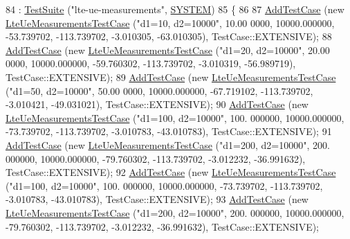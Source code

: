 \begin{DoxyCode}
84   : \hyperlink{classns3_1_1TestSuite_a904b0c40583b744d30908aeb94636d1a}{TestSuite} (\textcolor{stringliteral}{"lte-ue-measurements"}, \hyperlink{classns3_1_1TestSuite_a1ebfcab34ec8161e085e8e3a1855eae0a90c5529a26ab3a5ffcc6e57040dbd82e}{SYSTEM})
85 \{
86 
87   \hyperlink{classns3_1_1TestCase_a3718088e3eefd5d6454569d2e0ddd835}{AddTestCase} (\textcolor{keyword}{new} \hyperlink{classLteUeMeasurementsTestCase}{LteUeMeasurementsTestCase} (\textcolor{stringliteral}{"d1=10, d2=10000"},  10.00
      0000, 10000.000000, -53.739702, -113.739702, -3.010305, -63.010305), TestCase::EXTENSIVE);
88   \hyperlink{classns3_1_1TestCase_a3718088e3eefd5d6454569d2e0ddd835}{AddTestCase} (\textcolor{keyword}{new} \hyperlink{classLteUeMeasurementsTestCase}{LteUeMeasurementsTestCase} (\textcolor{stringliteral}{"d1=20, d2=10000"},  20.00
      0000, 10000.000000, -59.760302, -113.739702, -3.010319, -56.989719), TestCase::EXTENSIVE);
89   \hyperlink{classns3_1_1TestCase_a3718088e3eefd5d6454569d2e0ddd835}{AddTestCase} (\textcolor{keyword}{new} \hyperlink{classLteUeMeasurementsTestCase}{LteUeMeasurementsTestCase} (\textcolor{stringliteral}{"d1=50, d2=10000"},  50.00
      0000, 10000.000000, -67.719102, -113.739702, -3.010421, -49.031021), TestCase::EXTENSIVE);
90   \hyperlink{classns3_1_1TestCase_a3718088e3eefd5d6454569d2e0ddd835}{AddTestCase} (\textcolor{keyword}{new} \hyperlink{classLteUeMeasurementsTestCase}{LteUeMeasurementsTestCase} (\textcolor{stringliteral}{"d1=100, d2=10000"},  100.
      000000, 10000.000000, -73.739702, -113.739702, -3.010783, -43.010783), TestCase::EXTENSIVE);
91   \hyperlink{classns3_1_1TestCase_a3718088e3eefd5d6454569d2e0ddd835}{AddTestCase} (\textcolor{keyword}{new} \hyperlink{classLteUeMeasurementsTestCase}{LteUeMeasurementsTestCase} (\textcolor{stringliteral}{"d1=200, d2=10000"},  200.
      000000, 10000.000000, -79.760302, -113.739702, -3.012232, -36.991632), TestCase::EXTENSIVE);
92   \hyperlink{classns3_1_1TestCase_a3718088e3eefd5d6454569d2e0ddd835}{AddTestCase} (\textcolor{keyword}{new} \hyperlink{classLteUeMeasurementsTestCase}{LteUeMeasurementsTestCase} (\textcolor{stringliteral}{"d1=100, d2=10000"},  100.
      000000, 10000.000000, -73.739702, -113.739702, -3.010783, -43.010783), TestCase::EXTENSIVE);
93   \hyperlink{classns3_1_1TestCase_a3718088e3eefd5d6454569d2e0ddd835}{AddTestCase} (\textcolor{keyword}{new} \hyperlink{classLteUeMeasurementsTestCase}{LteUeMeasurementsTestCase} (\textcolor{stringliteral}{"d1=200, d2=10000"},  200.
      000000, 10000.000000, -79.760302, -113.739702, -3.012232, -36.991632), TestCase::EXTENSIVE);

\end{DoxyCode}
